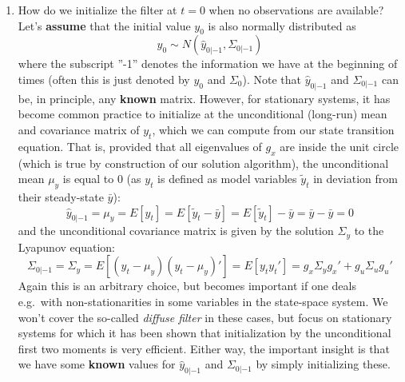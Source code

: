 \begin{enumerate}
\item How do we initialize the filter at \(t=0\) when no observations are available?
Let's \textbf{assume} that the initial value \(y_0\) is also normally distributed as
\begin{equation*}
y_0 \sim N(\hat{y}_{0|-1},\Sigma_{0|-1})
\end{equation*}
where the subscript ''-1'' denotes the information we have at the beginning of times (often this is just denoted by \(y_0\) and \(\Sigma_0\)).
Note that \(\hat{y}_{0|-1}\) and \(\Sigma_{0|-1}\) can be, in principle, any \textbf{known} matrix.
However, for stationary systems, it has become common practice to initialize at the unconditional (long-run) mean and covariance matrix of \(y_t\),
  which we can compute from our state transition equation.
That is, provided that all eigenvalues of \(g_x\) are inside the unit circle (which is true by construction of our solution algorithm),
  the unconditional mean \(\mu_y\) is equal to 0 (as \(y_t\) is defined as model variables \(\tilde{y}_t\) in deviation from their steady-state \(\bar{y}\)):
\begin{equation*}
\hat{y}_{0|-1} = \mu_y = E[y_t] = E[\tilde{y}_t - \bar{y}] = E[\tilde{y}_t] - \bar{y} = \bar{y} - \bar{y} = 0
\end{equation*}
  and the unconditional covariance matrix is given by the solution \(\Sigma_y\) to the Lyapunov equation:
\begin{equation*}
\Sigma_{0|-1} = \Sigma_y = E[(y_t-\mu_y)(y_t-\mu_y)'] = E[y_t y_t'] = g_x \Sigma_y g_x' + g_u \Sigma_u g_u'
\end{equation*}
Again this is an arbitrary choice, but becomes important if one deals e.g.\ with non-stationarities in some variables in the state-space system.
We won't cover the so-called \emph{diffuse filter} in these cases,
  but focus on stationary systems for which it has been shown that initialization by the unconditional first two moments is very efficient.
Either way, the important insight is that we have some \textbf{known} values for \(\hat{y}_{0|-1}\) and \(\Sigma_{0|-1}\) by simply initializing these.


\end{enumerate}
